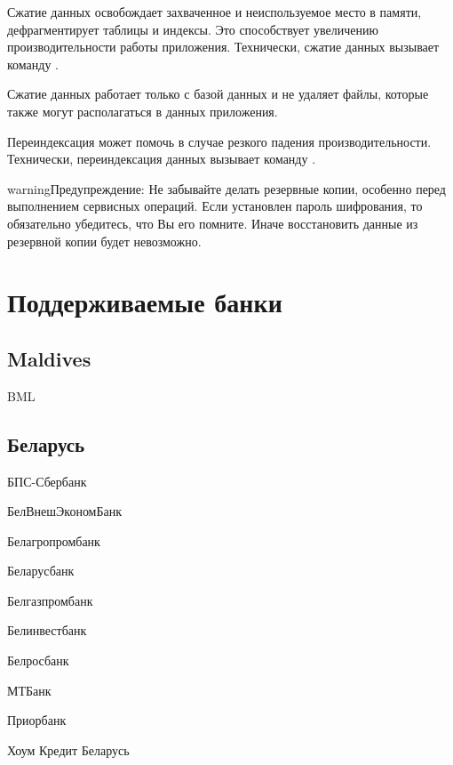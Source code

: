 \documentclass[a4paper,10pt,russian]{sphinxmanual}
\begin{document}
\noindent{}

Сжатие данных освобождает захваченное и неиспользуемое место в памяти, дефрагментирует таблицы и индексы.
Это способствует увеличению производительности работы приложения. Технически, сжатие данных вызывает команду .

Сжатие данных работает только с базой данных и не удаляет файлы, которые также могут располагаться в данных приложения.

Переиндексация может помочь в случае резкого падения производительности. Технически, переиндексация данных вызывает
команду .

\begin{sphinxadmonition}{warning}{Предупреждение:}
Не забывайте делать резервные копии, особенно перед выполнением сервисных операций. Если установлен пароль шифрования, то обязательно убедитесь, что Вы его помните. Иначе восстановить данные из резервной копии будет невозможно.
\end{sphinxadmonition}


\chapter{Поддерживаемые банки}
\label{\detokenize{banks:chapter-supported-banks}}\label{\detokenize{banks:id1}}\label{\detokenize{banks::doc}}

\section{Maldives}
\label{\detokenize{banks:maldives}}
BML


\section{Беларусь}
\label{\detokenize{banks:id2}}
БПС-Сбербанк

БелВнешЭкономБанк

Белагропромбанк

Беларусбанк

Белгазпромбанк

Белинвестбанк

Белросбанк

МТБанк

Приорбанк

Хоум Кредит Беларусь
\end{document}
